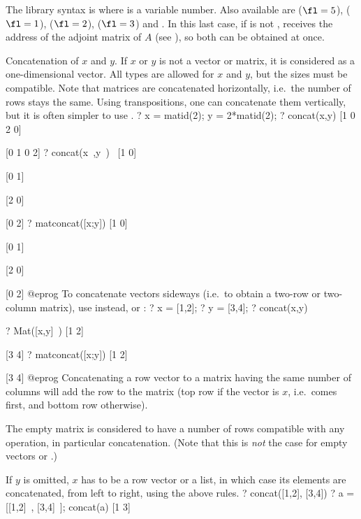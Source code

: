 The library syntax is  where  is a variable number.
Also available are
 ($\fl=5$),
 ($\fl=1$),
 ($\fl=2$),
 ($\fl=3$) and
. In this
last case, if  is not ,  receives the address of
the adjoint matrix of $A$ (see ), so both can be obtained at
once.

\label{se:concat}
Concatenation of $x$ and $y$. If $x$ or $y$ is
not a vector or matrix, it is considered as a one-dimensional vector. All
types are allowed for $x$ and $y$, but the sizes must be compatible. Note
that matrices are concatenated horizontally, i.e.~the number of rows stays
the same. Using transpositions, one can concatenate them vertically,
but it is often simpler to use .
\bprog
? x = matid(2); y = 2*matid(2);
? concat(x,y)
[1 0 2 0]

[0 1 0 2]
? concat(x~,y~)~
[1 0]

[0 1]

[2 0]

[0 2]
? matconcat([x;y])
[1 0]

[0 1]

[2 0]

[0 2]
@eprog\noindent
To concatenate vectors sideways (i.e.~to obtain a two-row or two-column
matrix), use  instead, or :
\bprog
? x = [1,2];
? y = [3,4];
? concat(x,y)

? Mat([x,y]~)
[1 2]

[3 4]
? matconcat([x;y])
[1 2]

[3 4]
@eprog
Concatenating a row vector to a matrix having the same number of columns will
add the row to the matrix (top row if the vector is $x$, i.e.~comes first, and
bottom row otherwise).

The empty matrix \kbd{[;]} is considered to have a number of rows compatible
with any operation, in particular concatenation. (Note that this is
\emph{not} the case for empty vectors \kbd{[~]} or \kbd{[~]\til}.)

If $y$ is omitted, $x$ has to be a row vector or a list, in which case its
elements are concatenated, from left to right, using the above rules.
\bprog
? concat([1,2], [3,4])
? a = [[1,2]~, [3,4]~]; concat(a)
[1 3]

